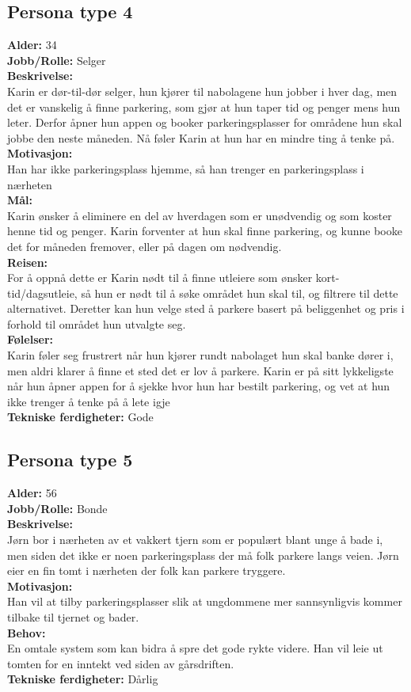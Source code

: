 \documentclass[12pt]{article}
\begin{document}
    \subsection{Persona type 4}
    \textbf{Alder:} 34 \\\textbf{Jobb/Rolle:} Selger\\\textbf{Beskrivelse:}\\Karin er dør-til-dør selger, hun kjører til nabolagene hun jobber i hver dag, men det er vanskelig å finne parkering, som gjør at hun taper tid og penger mens hun leter. Derfor åpner hun appen og booker parkeringsplasser for områdene hun skal jobbe den neste måneden. Nå føler Karin at hun har en mindre ting å tenke på.\\\textbf{Motivasjon:}\\Han har ikke parkeringsplass hjemme, så han trenger en parkeringsplass i nærheten\\\textbf{Mål:}\\Karin ønsker å eliminere en del av hverdagen som er unødvendig og som koster henne tid og penger. Karin forventer at hun skal finne parkering, og kunne booke det for måneden fremover, eller på dagen om nødvendig.\\\textbf{Reisen:}\\For å oppnå dette er Karin nødt til å finne utleiere som ønsker kort-tid/dagsutleie, så hun er nødt til å søke området hun skal til, og filtrere til dette alternativet. Deretter kan hun velge sted å parkere basert på beliggenhet og pris i forhold til området hun utvalgte seg.\\\textbf{Følelser:}\\Karin føler seg frustrert når hun kjører rundt nabolaget hun skal banke dører i, men aldri klarer å finne et sted det er lov å parkere. Karin er på sitt lykkeligste når hun åpner appen for å sjekke hvor hun har bestilt parkering, og vet at hun ikke trenger å tenke på å lete igje\\\textbf{Tekniske ferdigheter:} Gode

    \subsection{Persona type 5}
    \textbf{Alder:} 56\\\textbf{Jobb/Rolle:} Bonde\\\textbf{Beskrivelse:}\\Jørn bor i nærheten av et vakkert tjern som er populært blant unge å bade i, men siden det ikke er noen parkeringsplass der må folk parkere langs veien. Jørn eier en fin tomt i nærheten der folk kan parkere tryggere.\\\textbf{Motivasjon:}\\Han vil at tilby parkeringsplasser slik at ungdommene mer sannsynligvis kommer tilbake til tjernet og bader.\\\textbf{Behov:}\\En omtale system som kan bidra å spre det gode rykte videre. Han vil leie ut tomten for en inntekt ved siden av gårsdriften.\\\textbf{Tekniske ferdigheter:} Dårlig
\end{document}
